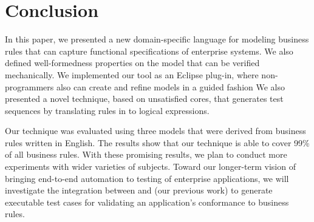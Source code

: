 \section{Conclusion}

In this paper, we presented a new domain-specific language for modeling business
rules that can capture functional specifications of enterprise
systems. We also defined well-formedness properties on the model that can be verified
mechanically. We implemented our tool as an Eclipse plug-in, where
non-programmers also can create and refine models in a guided fashion
We also presented a novel technique, based on unsatisfied cores, that generates test sequences
by translating rules in to logical expressions.


Our technique was evaluated using three models that were derived from business rules written
in English. The results show that our technique
is able to cover 99\% of all business rules. With these promising results, we plan to conduct more
experiments with wider varieties of subjects. Toward our longer-term
vision of bringing end-to-end automation to testing of enterprise
applications, we will investigate the integration between \tool{} and
\wateg{} (our previous work) to generate executable test cases for validating an
application's conformance to business rules.

